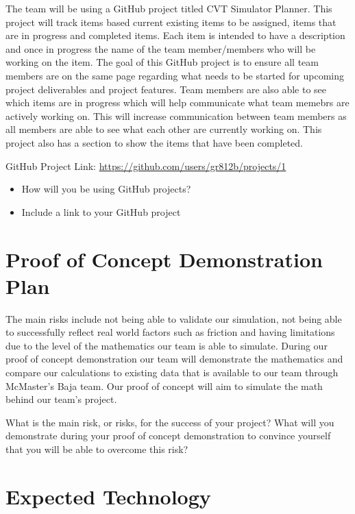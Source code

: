 \documentclass{article}
\begin{document}
The team will be using a GitHub project titled CVT Simulator Planner. 
This project will track items based current existing items to be assigned, items that are in progress and completed items. Each item is intended to have a description and once in progress the name of the team member/members who will be working on the item.
The goal of this GitHub project is to ensure all team members are on the same page regarding what needs to be started for upcoming project deliverables and project features. 
Team members are also able to see which items are in progress which will help communicate what team memebrs are actively working on.
This will increase communication between team members as all members are able to see what each other are currently working on.
This project also has a section to show the items that have been completed. 

GitHub Project Link: \url{https://github.com/users/gr812b/projects/1}


\begin{itemize}
  \item How will you be using GitHub projects?
  \item Include a link to your GitHub project
\end{itemize}


\section{Proof of Concept Demonstration Plan}

The main risks include not being able to validate our simulation, not being able to successfully reflect real world factors such as friction and having limitations due to the level of the mathematics our team is able to simulate.
During our proof of concept demonstration our team will demonstrate the mathematics and compare our calculations to existing data that is available to our team through McMaster's Baja team. 
Our proof of concept will aim to simulate the math behind our team's project. 


What is the main risk, or risks, for the success of your project?  What will you
demonstrate during your proof of concept demonstration to convince yourself that
you will be able to overcome this risk?

\section{Expected Technology}
\end{document}
